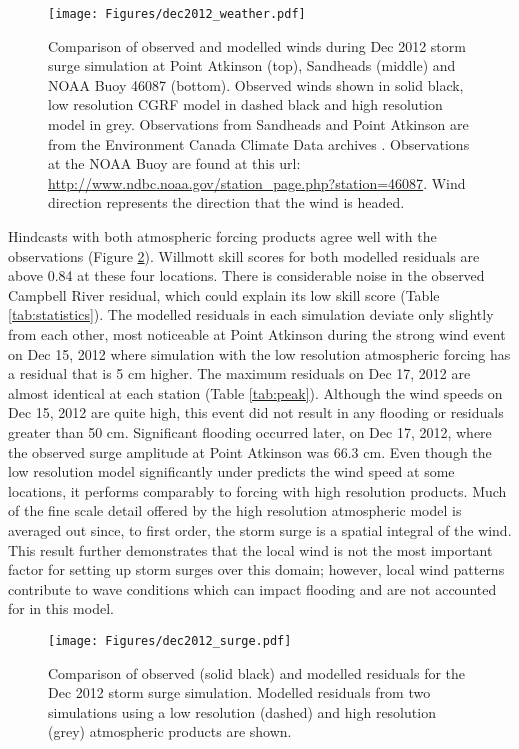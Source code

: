 \documentclass[letterpaper]{tATO2e}
\begin{document}
\begin{figure}
\centering
\texttt{[image: Figures/dec2012\_weather.pdf]}
\caption{{\color{red}Comparison of observed and modelled winds during Dec 2012 storm surge simulation at Point Atkinson (top), Sandheads (middle) and NOAA Buoy 46087 (bottom). Observed winds shown in solid black, low resolution CGRF model in dashed black and high resolution model in grey. Observations from Sandheads and Point Atkinson are from the Environment Canada Climate Data archives \citep{ECClimateArchive}.  Observations at the NOAA Buoy are found at this url: \url{http://www.ndbc.noaa.gov/station_page.php?station=46087}. Wind direction represents the direction that the wind is headed.} }
\label{fig:dec2012_weather}
\end{figure}

Hindcasts with both atmospheric forcing products agree well with the observations (Figure \ref{fig:dec2012_surge}). Willmott skill scores for both modelled residuals are above {\color{red} 0.84} at these four locations. {\color{red} There is considerable noise in the observed Campbell River residual, which could explain its low skill score (Table \ref{tab:statistics}).} {\color{red} The modelled residuals in each simulation deviate only slightly from each other, most noticeable at Point Atkinson during the strong wind event on Dec 15, 2012 where simulation with the low resolution atmospheric forcing has a residual that is 5 cm higher.  The maximum residuals on Dec 17, 2012 are almost identical at each station (Table \ref{tab:peak}).} Although the wind speeds on Dec 15, 2012 are quite high, this event did not result in any flooding or residuals greater than 50 cm. Significant flooding occurred later, on Dec 17, 2012, where the observed surge amplitude at Point Atkinson was {\color{red}66.3 cm}. Even though the low resolution model significantly under predicts the wind speed at some locations, it performs comparably to forcing with high resolution products. Much of the fine scale detail offered by the high resolution atmospheric model is averaged out since, to first order, the storm surge is a spatial integral of the wind. This result further demonstrates that the local wind is not the most important factor for setting up storm surges over this domain; however, local wind patterns contribute to wave conditions which can impact flooding and are not accounted for in this model. 

\begin{figure}
\centering
\texttt{[image: Figures/dec2012\_surge.pdf]}
\caption{Comparison of observed (solid black) and modelled residuals for the Dec 2012 storm surge simulation. Modelled residuals from two simulations using a low resolution (dashed) and high resolution (grey) atmospheric products are shown. }
\label{fig:dec2012_surge}
\end{figure}
\end{document}
